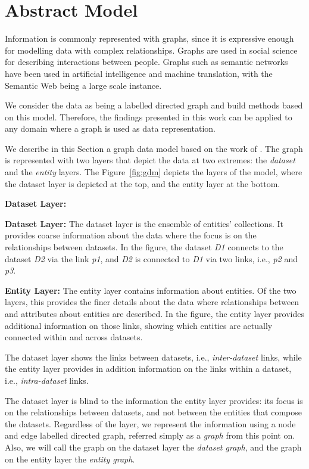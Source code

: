 \section{Abstract Model}
\label{chap:ssd:gdm:abstract-model}

Information is commonly represented with graphs, since it is expressive enough for modelling data with complex relationships. Graphs are used in social science for describing interactions between people. Graphs such as semantic networks~\cite{sowa2006semantic} have been used in artificial intelligence and machine translation, with the Semantic Web being a large scale instance.

We consider the data as being a labelled directed graph and build methods based on this model. Therefore, the findings presented in this work can be applied to any domain where a graph is used as data representation.

We describe in this Section a graph data model based on the work of \cite{delbru:jws:entity}. The graph is represented with two layers that depict the data at two extremes: the \emph{dataset} and the \emph{entity} layers. The Figure~\ref{fig:gdm} depicts the layers of the model, where the dataset layer is depicted at the top, and the entity layer at the bottom.
\begin{labeling}{\textbf{Dataset Layer:}}
	\item[\textbf{Dataset Layer:}] The dataset layer is the ensemble of entities' collections. It provides coarse information about the data where the focus is on the relationships between datasets. In the figure, the dataset \emph{D1} connects to the dataset \emph{D2} via the link \emph{p1}, and \emph{D2} is connected to \emph{D1} via two links, i.e., \emph{p2} and \emph{p3}.
	\item[\textbf{Entity Layer:}] The entity layer contains information about entities. Of the two layers, this provides the finer details about the data where relationships between and attributes about entities are described. In the figure, the entity layer provides additional information on those links, showing which entities are actually connected within and across datasets.
\end{labeling}

The dataset layer shows the links between datasets, i.e., \emph{inter-dataset} links, while the entity layer provides in addition information on the links within a dataset, i.e., \emph{intra-dataset} links.

The dataset layer is blind to the information the entity layer provides: its focus is on the relationships between datasets, and not between the entities that compose the datasets.
Regardless of the layer, we represent the information using a node and edge labelled directed graph, referred simply as a \emph{graph} from this point on. Also, we will call the graph on the dataset layer the \emph{dataset graph}, and the graph on the entity layer the \emph{entity graph}.

